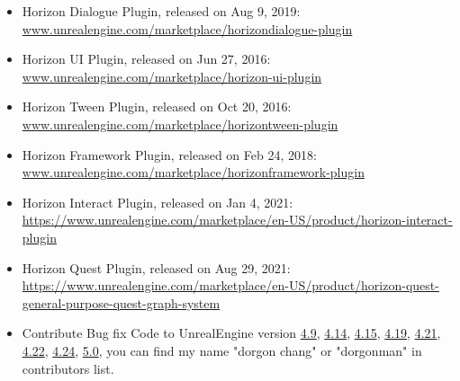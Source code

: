 \documentclass[a4paper,12pt]{memoir} %
\begin{document}
{
  \begin{itemize}
    \item Horizon Dialogue Plugin, released on Aug 9, 2019: \\
        \href{https://www.unrealengine.com/marketplace/horizondialogue-plugin}
             {www.unrealengine.com/marketplace/horizondialogue-plugin} \\
    \item Horizon UI Plugin, released on Jun 27, 2016: \\
        \href{https://www.unrealengine.com/marketplace/horizon-ui-plugin}
             {www.unrealengine.com/marketplace/horizon-ui-plugin} \\
    \item Horizon Tween Plugin, released on Oct 20, 2016: \\
        \href{https://www.unrealengine.com/marketplace/horizontween-plugin}
             {www.unrealengine.com/marketplace/horizontween-plugin} \\
    \item Horizon Framework Plugin, released on Feb 24, 2018: \\
          \href{https://www.unrealengine.com/marketplace/horizonframework-plugin}
               {www.unrealengine.com/marketplace/horizonframework-plugin} \\
    \item Horizon Interact Plugin, released on Jan 4, 2021: \\
          \href{https://www.unrealengine.com/marketplace/en-US/product/horizon-interact-plugin}
              {https://www.unrealengine.com/marketplace/en-US/product/horizon-interact-plugin}  \\
    \item Horizon Quest Plugin, released on Aug 29, 2021: \\
              \href{https://www.unrealengine.com/marketplace/en-US/product/horizon-quest-general-purpose-quest-graph-system}
                  {https://www.unrealengine.com/marketplace/en-US/product/horizon-quest-general-purpose-quest-graph-system}  \\
              
    \item Contribute Bug fix Code to UnrealEngine version 
    \href{https://docs.unrealengine.com/latest/INT/Support/Builds/ReleaseNotes/2015/4_9/index.html}{4.9}, 
    \href{https://docs.unrealengine.com/latest/INT/Support/Builds/ReleaseNotes/2016/4_14/index.html}{4.14}, 
    \href{https://docs.unrealengine.com/latest/INT/Support/Builds/ReleaseNotes/4_15/}{4.15},  
    \href{https://docs.unrealengine.com/latest/INT/Support/Builds/ReleaseNotes/4_19/}{4.19}, 
    \href{https://docs.unrealengine.com/latest/INT/Support/Builds/ReleaseNotes/4_21/}{4.21}, 
    \href{https://docs.unrealengine.com/latest/INT/Support/Builds/ReleaseNotes/4_22/}{4.22}, 
    \href{https://docs.unrealengine.com/latest/INT/Support/Builds/ReleaseNotes/4_24/}{4.24}, 
    \href{https://docs.unrealengine.com/5.0/en-US/unreal-engine-5-0-release-notes/}{5.0}, you can find my name "dorgon chang" or "dorgonman" in contributors list. \\



\end{itemize}}
\end{document}
